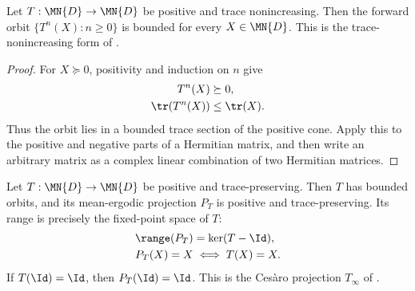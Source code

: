 \begin{theorem}
    \label{thm:positive_trace_nonincreasing_bounded_orbits}
    \leanok
    Let $T:\MN{D}\to\MN{D}$ be positive and trace nonincreasing. Then the
    forward orbit $\{T^n(X):n\geq0\}$ is bounded for every $X\in\MN{D}$.
    This is the trace-nonincreasing form of
    \cite[Proposition~6.3]{Wolf2012Quantum}.
\end{theorem}

\begin{proof}\leanok
    For $X\succeq0$, positivity and induction on $n$ give
    \begin{align}
        T^n(X)      & \succeq0, \notag \\
        \tr(T^n(X)) & \leq\tr(X).
    \end{align}
    Thus the orbit lies in a bounded trace section of the positive cone.
    Apply this to the positive and negative parts of a Hermitian matrix, and
    then write an arbitrary matrix as a complex linear combination of two
    Hermitian matrices.
\end{proof}

\begin{theorem}
    \label{thm:positive_trace_preserving_mean_ergodic_projection}
    \leanok
    Let $T:\MN{D}\to\MN{D}$ be positive and trace-preserving. Then $T$ has
    bounded orbits, and its mean-ergodic projection $P_T$ is positive and
    trace-preserving. Its range is precisely the fixed-point space of $T$:
    \begin{align}
        \range(P_T) & =\ker(T-\Id), \notag \\
        P_T(X)=X    & \iff T(X)=X.
        \label{eq:channel_positive_mean_ergodic}
    \end{align}
    If $T(\Id)=\Id$, then $P_T(\Id)=\Id$.
    This is the Ces\`aro projection $T_\infty$ of
    \cite[Proposition~6.3 and Equation~(6.14)]{Wolf2012Quantum}.
\end{theorem}

